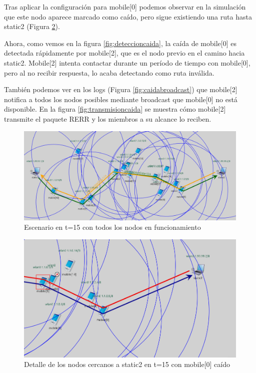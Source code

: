 Tras aplicar la configuración para mobile[0] podemos observar en la simulación que este nodo aparece marcado como caído, pero sigue existiendo una ruta hasta static2 (Figura \ref{fig:nodocaidot15}).

Ahora, como vemos en la figura \ref{fig:deteccioncaida}, la caída de mobile[0] es detectada rápidamente por mobile[2], que es el nodo previo en el camino hacia static2. Mobile[2] intenta contactar durante un período de tiempo con mobile[0], pero al no recibir respuesta, lo acaba detectando como ruta inválida.

También podemos ver en los logs (Figura \ref{fig:caidabroadcast}) que mobile[2] notifica a todos los nodos posibles mediante broadcast que mobile[0] no está disponible. En la figura \ref{fig:transmisioncaida} se muestra cómo mobile[2] transmite el paquete RERR y los miembros a su alcance lo reciben.

\begin{figure}[H]
    \centering
    \includegraphics[width=125mm, scale=0.75]{imaxes/aodv/ejercicio4_1.png}
    \caption{Escenario en t=15 con todos los nodos en funcionamiento}
    \label{fig:escenariot15}
\end{figure}

\begin{figure}[H]
    \centering
    \includegraphics[width=125mm, scale=0.75]{imaxes/aodv/ejercicio4_2.png}
    \caption{Detalle de los nodos cercanos a static2 en t=15 con mobile[0] caído}
    \label{fig:nodocaidot15}
\end{figure}

